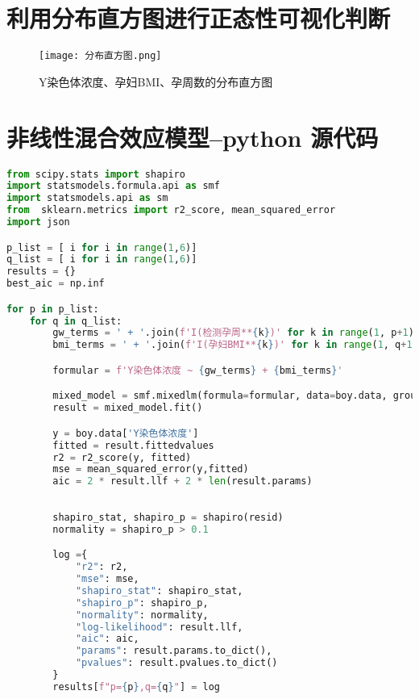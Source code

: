 \documentclass[withoutpreface,bwprint]{cumcmthesis} %
\begin{document}
\newpage


















\begin{appendices}

\section{利用分布直方图进行正态性可视化判断}
\begin{figure}[!h]
    \centering
    \texttt{[image: 分布直方图.png]}
    \caption{Y染色体浓度、孕妇BMI、孕周数的分布直方图}
    \label{fig4}
\end{figure}

\section{非线性混合效应模型--python 源代码}

\begin{lstlisting}[language=python]
from scipy.stats import shapiro
import statsmodels.formula.api as smf
import statsmodels.api as sm
from  sklearn.metrics import r2_score, mean_squared_error
import json

p_list = [ i for i in range(1,6)]
q_list = [ i for i in range(1,6)]
results = {}
best_aic = np.inf

for p in p_list:
    for q in q_list:
        gw_terms = ' + '.join(f'I(检测孕周**{k})' for k in range(1, p+1))
        bmi_terms = ' + '.join(f'I(孕妇BMI**{k})' for k in range(1, q+1))

        formular = f'Y染色体浓度 ~ {gw_terms} + {bmi_terms}'

        mixed_model = smf.mixedlm(formula=formular, data=boy.data, groups=boy.data["孕妇代码"])
        result = mixed_model.fit()

        y = boy.data['Y染色体浓度']
        fitted = result.fittedvalues
        r2 = r2_score(y, fitted)
        mse = mean_squared_error(y,fitted)
        aic = 2 * result.llf + 2 * len(result.params)
        
        
        shapiro_stat, shapiro_p = shapiro(resid)
        normality = shapiro_p > 0.1

        log ={
            "r2": r2,
            "mse": mse,
            "shapiro_stat": shapiro_stat,
            "shapiro_p": shapiro_p,
            "normality": normality,
            "log-likelihood": result.llf,
            "aic": aic,
            "params": result.params.to_dict(),
            "pvalues": result.pvalues.to_dict()
        }
        results[f"p={p},q={q}"] = log


\end{lstlisting}
\end{appendices}
\end{document}
